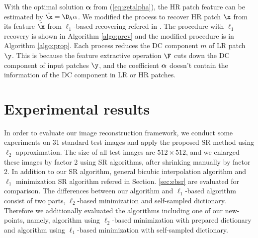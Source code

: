 \documentclass[10pt,japanese]{ikelab-sips}
\begin{document}
 With the optimal solution $\bm{\alpha}$ from (\ref{eq:getalpha}),
 the HR patch feature can be estimated by $\hat\x=\D_h\alpha$.
 We modified the process to recover HR patch $\x$ from its feature $\hat\x$
 from $\ell_1$-based recovering refered in \cite{Yang2012}.
 The procedure with $\ell_1$ recovery is shown in Algorithm \ref{algo:prev} and
 the modified procedure is in Algorithm \ref{algo:prop}.
 Each process reduces the DC component $m$ of LR patch $\y$.
 This is because the feature extractive operation $\F$ cuts down the DC component of
 input patches $\y$, and the coefficient $\bm{\alpha}$ doesn't contain the information of the DC component
 in LR or HR patches.

\section{Experimental results} \label{sec:experiments}

In order to evaluate our image reconstruction framework,
we conduct some experiments on 31 standard test images
and apply the proposed SR method using $\ell_2$ approximation.
The size of all test images are $512\times 512$,
and we enlarged these images by factor 2 using SR algorithms,
after shrinking manually by factor 2.
In addition to our SR algorithm,
general bicubic interpolation algorithm and
$\ell_1$ minimization SR algorithm
refered in Section. \ref{sec:ebsr} are evaluated for comparison.
The differences between our algorithm and $\ell_1$-based algorithm consist of two parts,
$\ell_2$-based minimization and self-sampled dictionary.
Therefore we additionally evaluated the algorithms 
including one of our new-points, namely,
algorithm using $\ell_2$-based minimization with prepared dictionary and
algorithm using $\ell_1$-based minimization with self-sampled dictionary.

\newcommand{\resultfig}[4]{
\begin{minipage}[t]{.22\hsize}
 \centering
 \texttt{[image: example-image-1x1.pdf]}
 \subcaption{#3\\($\mathrm{PSNR}=#4\,\mathrm{dB}$)}\label{fig:#1:#2}
\end{minipage}
}

\newcommand{\resultfigWithoutPsnr}[3]{
\begin{minipage}[t]{.22\hsize}
 \centering
 \texttt{[image: example-image-1x1.pdf]}
 \subcaption{#3\\{}}\label{fig:#1:#2}
\end{minipage}
}
\end{document}
